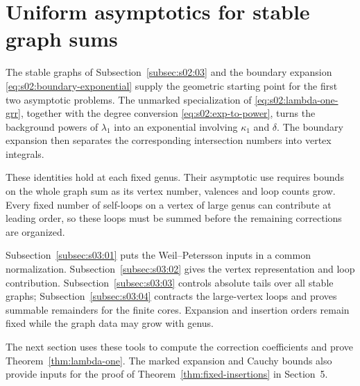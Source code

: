 \section{Uniform asymptotics for stable graph sums}
\label{sec:s03}

The stable graphs of Subsection~\ref{subsec:s02:03} and the boundary
expansion \eqref{eq:s02:boundary-exponential} supply the geometric
starting point for the first two asymptotic problems. The unmarked
specialization of \eqref{eq:s02:lambda-one-grr}, together with the
degree conversion \eqref{eq:s02:exp-to-power}, turns the background
powers of $\lambda_1$ into an exponential involving $\kappa_1$ and
$\delta$. The boundary expansion then separates the corresponding
intersection numbers into vertex integrals.

These identities hold at each fixed genus. Their asymptotic use requires
bounds on the whole graph sum as its vertex number, valences and loop
counts grow. Every fixed number of self-loops on a vertex of large genus
can contribute at leading order, so these loops must be summed before
the remaining corrections are organized.

Subsection~\ref{subsec:s03:01} puts the Weil--Petersson inputs in a
common normalization. Subsection~\ref{subsec:s03:02} gives the vertex
representation and loop contribution. Subsection~\ref{subsec:s03:03}
controls absolute tails over all stable graphs;
Subsection~\ref{subsec:s03:04} contracts the large-vertex loops and
proves summable remainders for the finite cores. Expansion and insertion
orders remain fixed while the graph data may grow with genus.

The next section uses these tools to compute the correction coefficients
and prove Theorem~\ref{thm:lambda-one}. The marked expansion and Cauchy
bounds also provide inputs for the proof of
Theorem~\ref{thm:fixed-insertions} in Section~5.





